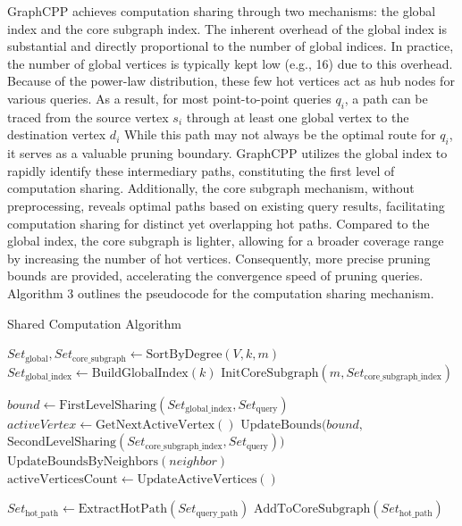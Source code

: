 \documentclass[lettersize,journal]{IEEEtran} %
\begin{document}
GraphCPP achieves computation sharing through two mechanisms: the global index and the core subgraph index. The inherent overhead of the global index is substantial and directly proportional to the number of global indices. In practice, the number of global vertices is typically kept low (e.g., 16) due to this overhead. Because of the power-law distribution, these few hot vertices act as hub nodes for various queries. As a result, for most point-to-point queries $q_i$, a path can be traced from the source vertex $s_i$ through at least one global vertex to the destination vertex $d_i$ While this path may not always be the optimal route for $q_i$, it serves as a valuable pruning boundary. GraphCPP utilizes the global index to rapidly identify these intermediary paths, constituting the first level of computation sharing. Additionally, the core subgraph mechanism, without preprocessing, reveals optimal paths based on existing query results, facilitating computation sharing for distinct yet overlapping hot paths. Compared to the global index, the core subgraph is lighter, allowing for a broader coverage range by increasing the number of hot vertices. Consequently, more precise pruning bounds are provided, accelerating the convergence speed of pruning queries. Algorithm 3 outlines the pseudocode for the computation sharing mechanism.

\begin{algorithm}
  \caption{Shared Computation Algorithm}
  \begin{algorithmic}[1]
  
      \State $Set_{\text{global}}, Set_{\text{core\_subgraph}} \gets \text{SortByDegree}(V, k, m)$
      \State $Set_{\text{global\_index}} \gets \text{BuildGlobalIndex}(k)$
      \State $\text{InitCoreSubgraph}(m, Set_{\text{core\_subgraph\_index}})$
  \EndFunction

      \State $bound \gets \text{FirstLevelSharing}(Set_{\text{global\_index}}, Set_{\text{query}})$
          \State $activeVertex \gets \text{GetNextActiveVertex}()$
              \State $\text{UpdateBounds}(bound, $\\
              $\text{SecondLevelSharing}(Set_{\text{core\_subgraph\_index}}, Set_{\text{query}}))$
          \EndIf
              \State $\text{UpdateBoundsByNeighbors}(neighbor)$
          \EndFor
          \State $\text{activeVerticesCount} \gets \text{UpdateActiveVertices}()$
      \EndWhile
  \EndFunction
  
      \State $Set_{\text{hot\_path}} \gets \text{ExtractHotPath}(Set_{\text{query\_path}})$
      \State $\text{AddToCoreSubgraph}(Set_{\text{hot\_path}})$
  \EndFunction

\end{algorithmic}
\end{algorithm}
\end{document}
